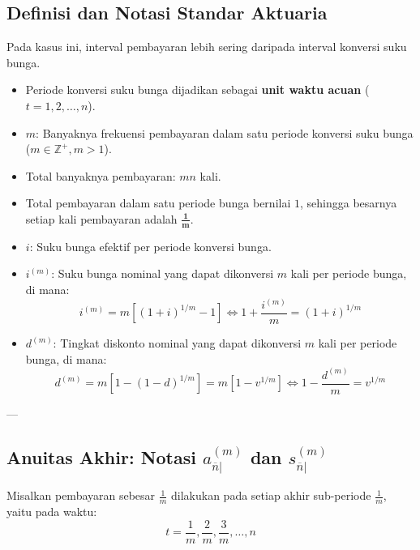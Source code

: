 \documentclass[11pt,a4paper]{article}
\begin{document}
\subsection{Definisi dan Notasi Standar Aktuaria}
Pada kasus ini, interval pembayaran lebih sering daripada interval konversi suku bunga.
\begin{itemize}[leftmargin=1.5em]
    \item Periode konversi suku bunga dijadikan sebagai \textbf{unit waktu acuan} ($t = 1, 2, \dots, n$).
    \item $m$: Banyaknya frekuensi pembayaran dalam satu periode konversi suku bunga ($m \in \mathbb{Z}^+, m > 1$).
    \item Total banyaknya pembayaran: $mn$ kali.
    \item Total pembayaran dalam satu periode bunga bernilai $1$, sehingga besarnya setiap kali pembayaran adalah $\mathbf{\frac{1}{m}}$.
    \item $i$: Suku bunga efektif per periode konversi bunga.
    \item $i^{(m)}$: Suku bunga nominal yang dapat dikonversi $m$ kali per periode bunga, di mana:
    \begin{equation}
        i^{(m)} = m \left[ (1+i)^{1/m} - 1 \right] \iff 1 + \frac{i^{(m)}}{m} = (1+i)^{1/m}
    \end{equation}
    \item $d^{(m)}$: Tingkat diskonto nominal yang dapat dikonversi $m$ kali per periode bunga, di mana:
    \begin{equation}
        d^{(m)} = m \left[ 1 - (1-d)^{1/m} \right] = m \left[ 1 - v^{1/m} \right] \iff 1 - \frac{d^{(m)}}{m} = v^{1/m}
    \end{equation}
\end{itemize}

---

\subsection{Anuitas Akhir: Notasi \texorpdfstring{$a_{\overline{n}|}^{(m)}$}{a\_n\textasciicircum(m)} dan \texorpdfstring{$s_{\overline{n}|}^{(m)}$}{s\_n\textasciicircum(m)}}

Misalkan pembayaran sebesar $\frac{1}{m}$ dilakukan pada setiap akhir sub-periode $\frac{1}{m}$, yaitu pada waktu:
\begin{equation*}
    t = \frac{1}{m}, \frac{2}{m}, \frac{3}{m}, \dots, n
\end{equation*}
\end{document}
